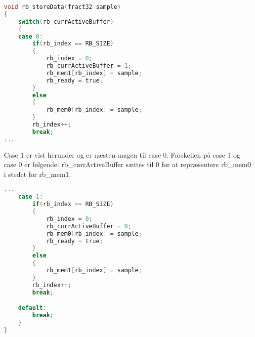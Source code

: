 \begin{lstlisting}[language=C,numbers=none]
void rb_storeData(fract32 sample)
{
    switch(rb_currActiveBuffer)
    {
    case 0:
        if(rb_index == RB_SIZE)
        {
            rb_index = 0;
            rb_currActiveBuffer = 1;
            rb_mem1[rb_index] = sample;
            rb_ready = true;
        }
        else
        {
            rb_mem0[rb_index] = sample;
        }
        rb_index++;
        break;
...
\end{lstlisting}

Case 1 er vist herunder og er næsten magen til case 0. Forskellen på case 1 og case 0 er følgende: 
rb\_currActiveBuffer sættes til 0 for at repræsentere rb\_mem0 i stedet for rb\_mem1. 

\begin{lstlisting}[language=C,numbers=none]
...
    case 1:
        if(rb_index == RB_SIZE)
        {
            rb_index = 0;
            rb_currActiveBuffer = 0;
            rb_mem0[rb_index] = sample;
            rb_ready = true;
        }
        else
        {
            rb_mem1[rb_index] = sample;
        }
        rb_index++;
        break;

    default:
        break;
    }
}\end{lstlisting}





